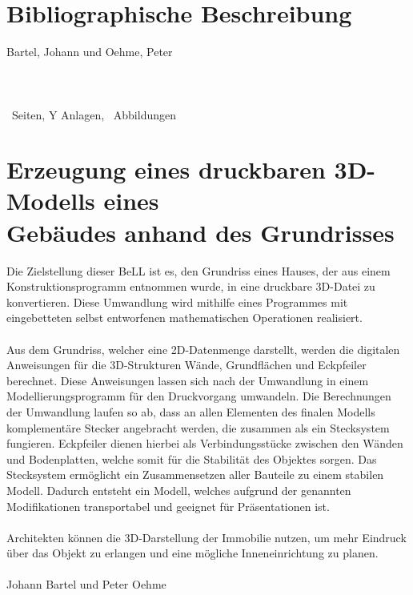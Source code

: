 \section*{Bibliographische Beschreibung}
Bartel, Johann und Oehme, Peter\\\\
\q{\docTitle}\\\\
  \theseitennr\ Seiten, Y Anlagen, \totalfigures\ Abbildungen
 
  \newpage
 
\section*{Erzeugung eines druckbaren 3D-Modells eines \\ Gebäudes anhand des Grundrisses}
 	
 
 Die Zielstellung dieser BeLL ist es, den Grundriss eines Hauses, der aus einem Konstruktionsprogramm entnommen wurde, in eine druckbare 3D-Datei zu konvertieren.
 Diese Umwandlung wird mithilfe eines Programmes mit eingebetteten selbst entworfenen mathematischen Operationen realisiert.\\\\
 Aus dem Grundriss, welcher eine 2D-Datenmenge darstellt, werden die digitalen Anweisungen für die 3D-Strukturen Wände, Grundflächen und \mbox{Eckpfeiler} berechnet. 
 Diese Anweisungen lassen sich nach der Umwandlung in einem Modellierungsprogramm für den Druckvorgang umwandeln.
 Die Berechnungen der Umwandlung laufen so ab, dass an allen Elementen des finalen Modells komplementäre Stecker angebracht werden, die zusammen als ein Stecksystem fungieren. 
 Eckpfeiler dienen hierbei als Verbindungsstücke zwischen den Wänden und Bodenplatten, welche somit für die Stabilität des Objektes  sorgen. 
 Das Stecksystem ermöglicht ein Zusammensetzen aller Bauteile zu einem stabilen Modell. 
 Dadurch entsteht ein Modell, welches aufgrund der genannten Modifikationen transportabel und geeignet für Präsentationen ist.\\\\
 Architekten können die 3D-Darstellung der Immobilie  nutzen, um mehr Eindruck über das Objekt zu erlangen und eine mögliche Inneneinrichtung zu planen.\\\\
 Johann Bartel und Peter Oehme
